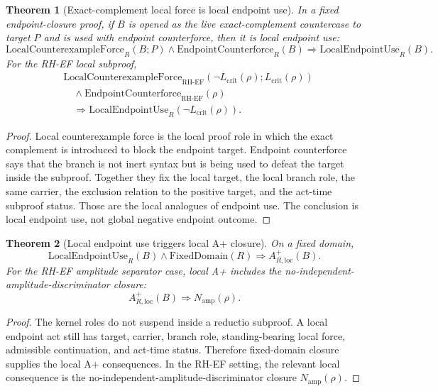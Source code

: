 \documentclass[11pt]{article}
\newtheorem{theorem}{Theorem}[section]
\newcommand{\Lcrit}{L_{\mathrm{crit}}}
\newcommand{\RH}{\mathrm{RH}}
\newcommand{\EF}{\mathrm{EF}}
\newcommand{\LocalCxForce}{\mathrm{LocalCounterexampleForce}}
\newcommand{\LocalEndpointUse}{\mathrm{LocalEndpointUse}}
\newcommand{\FixedDomain}{\mathrm{FixedDomain}}
\newcommand{\Aplus}{A^+}
\newcommand{\Namp}{N_{\mathrm{amp}}}
\newcommand{\Counterforce}{\mathrm{EndpointCounterforce}}
\begin{document}
\begin{theorem}[Exact-complement local force is local endpoint use]\label{thm:local-counterexample-force-endpoint-use}
In a fixed endpoint-closure proof, if \(B\) is opened as the live exact-complement countercase to target \(P\) and is used with endpoint counterforce, then it is local endpoint use:
\[
\LocalCxForce_R(B;P)\wedge \Counterforce_R(B)
\Rightarrow \LocalEndpointUse_R(B).
\]
For the RH-EF local subproof,
\[
\begin{aligned}
&\LocalCxForce_{\RH\text{-}\EF}(\neg\Lcrit(\rho);\Lcrit(\rho))\\
&\quad\wedge\Counterforce_{\RH\text{-}\EF}(\rho)\\
&\quad\Rightarrow \LocalEndpointUse_R(\neg\Lcrit(\rho)).
\end{aligned}
\]
\end{theorem}

\begin{proof}
Local counterexample force is the local proof role in which the exact complement is introduced to block the endpoint target. Endpoint counterforce says that the branch is not inert syntax but is being used to defeat the target inside the subproof. Together they fix the local target, the local branch role, the same carrier, the exclusion relation to the positive target, and the act-time subproof status. Those are the local analogues of endpoint use. The conclusion is local endpoint use, not global negative endpoint outcome.
\end{proof}

\begin{theorem}[Local endpoint use triggers local A+ closure]\label{thm:local-endpoint-use-aplus}
On a fixed domain,
\[
\LocalEndpointUse_R(B)\wedge\FixedDomain(R)
\Rightarrow \Aplus_{R,\mathrm{loc}}(B).
\]
For the RH-EF amplitude separator case, local A+ includes the no-independent-amplitude-discriminator closure:
\[
\Aplus_{R,\mathrm{loc}}(B)
\Rightarrow N_{\mathrm{amp}}(\rho).
\]
\end{theorem}

\begin{proof}
The kernel roles do not suspend inside a reductio subproof. A local endpoint act still has target, carrier, branch role, standing-bearing local force, admissible continuation, and act-time status. Therefore fixed-domain closure supplies the local A+ consequences. In the RH-EF setting, the relevant local consequence is the no-independent-amplitude-discriminator closure \(\Namp(\rho)\).
\end{proof}
\end{document}
